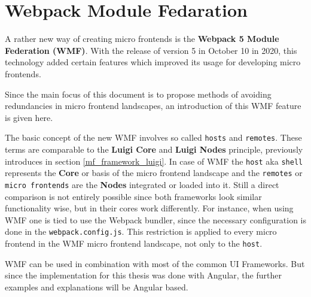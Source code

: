 \section{Webpack Module Fedaration}
\label{wmf_chap_2}

A rather new way of creating micro frontends is the \textbf{Webpack 5 Module Federation (WMF)}. With the release of version 5 in October 10 in 2020, this technology added certain features which improved its usage for developing micro frontends.\cite{wmf_concepts}

Since the main focus of this document is to propose methods of avoiding redundancies in micro frontend landscapes, an introduction of this WMF feature is given here.

The basic concept of the new WMF involves so called \texttt{hosts} and \texttt{remotes}. These terms are comparable to the \textbf{Luigi Core} and \textbf{Luigi Nodes} principle, previously introduces in section \ref{mf_framework_luigi}. In case of WMF the \texttt{host} aka \texttt{shell} represents the \textbf{Core} or basis of the micro frontend landscape and the \texttt{remotes} or \texttt{micro frontends} are the \textbf{Nodes} integrated or loaded into it. 
Still a direct comparison is not entirely possible since both frameworks look similar functionality wise, but in their cores work differently. For instance, when using WMF one is tied to use the Webpack bundler, since the necessary configuration is done in the \texttt{webpack.config.js}. This restriction is applied to every micro frontend in the WMF micro frontend landscape, not only to the \texttt{host}.

WMF can be used in combination with most of the common UI Frameworks. But since the implementation for this thesis was done with Angular, the further examples and explanations will be Angular based.


